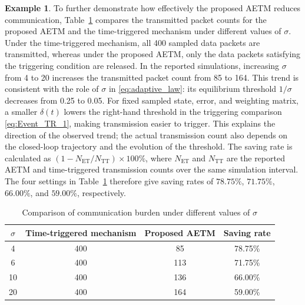 \documentclass[preprint,review,fleqn,sort&compress,3p]{elsarticle}
\theoremstyle{definition} %
\theoremstyle{definition}%
\newtheorem{example}{Example}
\begin{document}
\begin{example}
To further demonstrate how effectively the proposed AETM reduces communication,
Table~\ref{tab:sigma_effect} compares the transmitted packet counts for the proposed AETM and the time-triggered mechanism under different values of $\sigma$.
Under the time-triggered mechanism, all 400 sampled data packets are transmitted, whereas under the proposed AETM, only the data packets satisfying the triggering condition are released.
In the reported simulations, increasing $\sigma$ from 4 to 20 increases the transmitted packet count from 85 to 164. This trend is consistent with the role of $\sigma$ in \eqref{eq:adaptive_law}: its equilibrium threshold $1/\sigma$ decreases from 0.25 to 0.05. For fixed sampled state, error, and weighting matrix, a smaller $\delta(t)$ lowers the right-hand threshold in the triggering comparison \eqref{eq:Event_TR_1}, making transmission easier to trigger. This explains the direction of the observed trend; the actual transmission count also depends on the closed-loop trajectory and the evolution of the threshold.
The saving rate is calculated as $(1-N_{\mathrm{ET}}/N_{\mathrm{TT}})\times100\%$, where $N_{\mathrm{ET}}$ and $N_{\mathrm{TT}}$ are the reported AETM and time-triggered transmission counts over the same simulation interval. The four settings in Table~\ref{tab:sigma_effect} therefore give saving rates of $78.75\%$, $71.75\%$, $66.00\%$, and $59.00\%$, respectively.
\begin{table}[htbp]
	\centering
	\caption{Comparison of communication burden under different values of $\sigma$}
	\label{tab:sigma_effect}
	\begin{tabular}{cccc}
		\toprule
		$\sigma$ & Time-triggered mechanism & Proposed AETM & Saving rate \\
		\midrule
		4  & 400 & 85  & 78.75\% \\
		6  & 400 & 113 & 71.75\% \\
		10 & 400 & 136 & 66.00\% \\
		20 & 400 & 164 & 59.00\% \\
		\bottomrule
	\end{tabular}
\end{table}

\end{example}
\end{document}
